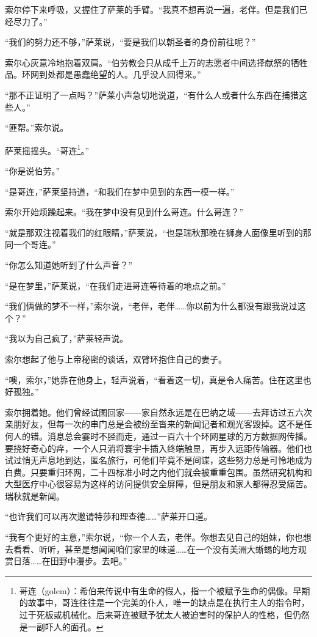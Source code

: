 \documentclass[AutoFakeBold=true]{book}
\begin{document}
索尔停下来呼吸，又握住了萨莱的手臂。``我真不想再说一遍，老伴。但是我们已经尽力了。''

``我们的努力还不够，''萨莱说，``要是我们以朝圣者的身份前往呢？''

索尔心灰意冷地抱着双肩。``伯劳教会只从成千上万的志愿者中间选择献祭的牺牲品。环网到处都是愚蠢绝望的人。几乎没人回得来。''

``那不正证明了一点吗？''萨莱小声急切地说道，``有什么人或者什么东西在捕猎这些人。''

``匪帮。''索尔说。

萨莱摇摇头。``哥连\footnote{哥连（golem）：希伯来传说中有生命的假人，指一个被赋予生命的偶像。早期的故事中，哥连往往是一个完美的仆人，唯一的缺点是在执行主人的指令时，过于死板或机械化。后来哥连被赋予犹太人被迫害时的保护人的性格，但仍然是一副吓人的面孔。}。''

``你是说伯劳。''

``是哥连，''萨莱坚持道，``和我们在梦中见到的东西一模一样。''

索尔开始烦躁起来。``我在梦中没有见到什么哥连。什么哥连？''

``就是那双注视着我们的红眼睛，''萨莱说，``也是瑞秋那晚在狮身人面像里听到的那同一个哥连。''

``你怎么知道她听到了什么声音？''

``是在梦里，''萨莱说，``在我们走进哥连等待着的地点之前。''

``我们俩做的梦不一样，''索尔说，``老伴，老伴……你以前为什么都没有跟我说过这个？''

``我以为自己疯了，''萨莱轻声说。

索尔想起了他与上帝秘密的谈话，双臂环抱住自己的妻子。

``噢，索尔，''她靠在他身上，轻声说着，``看着这一切，真是令人痛苦。住在这里也好孤独。''

索尔拥着她。他们曾经试图回家——家自然永远是在巴纳之域——去拜访过五六次亲朋好友，但每一次的串门总是会被纷至沓来的新闻记者和观光客毁掉。这不是任何人的错。消息总会霎时不胫而走，通过一百六十个环网星球的万方数据网传播。要挠好奇心的痒，一个人只消将寰宇卡插入终端触显，再步入远距传输器。他们也试过悄无声息地到达，匿名旅行，可他们毕竟不是间谍，这些努力总是可怜地成为白费。只要重归环网，二十四标准小时之内他们就会被重重包围。虽然研究机构和大型医疗中心很容易为这样的访问提供安全屏障，但是朋友和家人都得忍受痛苦。瑞秋就是新闻。

``也许我们可以再次邀请特莎和理查德……''萨莱开口道。

``我有个更好的主意，''索尔说，``你一个人去，老伴。你想去见自己的姐妹，你也想去看看、听听，甚至是想闻闻咱们家里的味道……在一个没有美洲大蜥蜴的地方观赏日落……在田野中漫步。去吧。''
\end{document}
